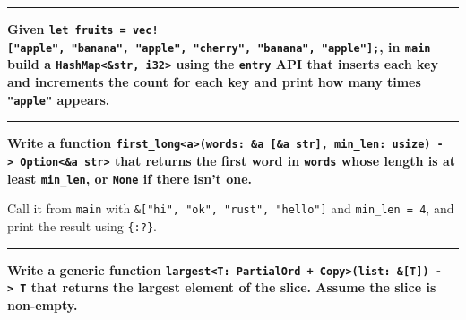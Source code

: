 \documentclass[
  11pt,
]{article}
\newenvironment{Shaded}{}{}
\begin{document}
\begin{Shaded}
\begin{Highlighting}[]


\end{Highlighting}
\end{Shaded}

\begin{center}\rule{0.5\linewidth}{0.5pt}\end{center}

\textbf{Given
\texttt{let\ fruits\ =\ vec!{[}"apple",\ "banana",\ "apple",\ "cherry",\ "banana",\ "apple"{]};},
in \texttt{main} build a
\texttt{HashMap\textless{}\&str,\ i32\textgreater{}} using the
\texttt{entry} API that inserts each key and increments the count for
each key and print how many times \texttt{"apple"} appears.}

\begin{Shaded}
\begin{Highlighting}[]


\end{Highlighting}
\end{Shaded}

\begin{center}\rule{0.5\linewidth}{0.5pt}\end{center}

\textbf{Write a function
\texttt{first\_long\textless{}\textquotesingle{}a\textgreater{}(words:\ \&\textquotesingle{}a\ {[}\&\textquotesingle{}a\ str{]},\ min\_len:\ usize)\ -\textgreater{}\ Option\textless{}\&\textquotesingle{}a\ str\textgreater{}}
that returns the first word in \texttt{words} whose length is at least
\texttt{min\_len}, or \texttt{None} if there isn't one.}

Call it from \texttt{main} with
\texttt{\&{[}"hi",\ "ok",\ "rust",\ "hello"{]}} and
\texttt{min\_len\ =\ 4}, and print the result using \texttt{\{:?\}}.

\begin{Shaded}
\begin{Highlighting}[]


\end{Highlighting}
\end{Shaded}

\begin{center}\rule{0.5\linewidth}{0.5pt}\end{center}

\textbf{Write a generic function
\texttt{largest\textless{}T:\ PartialOrd\ +\ Copy\textgreater{}(list:\ \&{[}T{]})\ -\textgreater{}\ T}
that returns the largest element of the slice. Assume the slice is
non-empty.}
\end{document}
